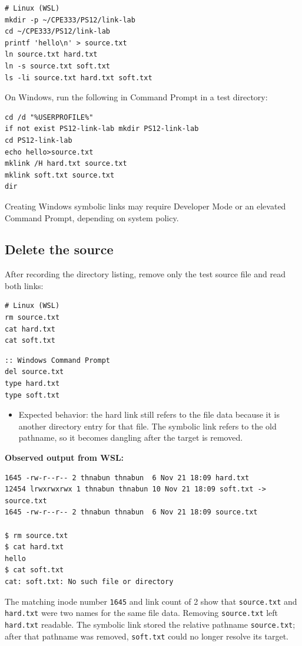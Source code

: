 \documentclass[a4paper,11pt]{article}
\begin{document}
\begin{lstlisting}
# Linux (WSL)
mkdir -p ~/CPE333/PS12/link-lab
cd ~/CPE333/PS12/link-lab
printf 'hello\n' > source.txt
ln source.txt hard.txt
ln -s source.txt soft.txt
ls -li source.txt hard.txt soft.txt
\end{lstlisting}

On Windows, run the following in Command Prompt in a test directory:
\begin{lstlisting}
cd /d "%USERPROFILE%"
if not exist PS12-link-lab mkdir PS12-link-lab
cd PS12-link-lab
echo hello>source.txt
mklink /H hard.txt source.txt
mklink soft.txt source.txt
dir
\end{lstlisting}

\noindent Creating Windows symbolic links may require Developer Mode or an
elevated Command Prompt, depending on system policy.

\subsection{Delete the source}
After recording the directory listing, remove only the test source file and
read both links:
\begin{lstlisting}
# Linux (WSL)
rm source.txt
cat hard.txt
cat soft.txt
\end{lstlisting}
\begin{lstlisting}
:: Windows Command Prompt
del source.txt
type hard.txt
type soft.txt
\end{lstlisting}

\begin{itemize}
  \item Expected behavior: the hard link still refers to the file data because
  it is another directory entry for that file. The symbolic link refers to the
  old pathname, so it becomes dangling after the target is removed.
\end{itemize}

\noindent\textbf{Observed output from WSL:}
\begin{lstlisting}
1645 -rw-r--r-- 2 thnabun thnabun  6 Nov 21 18:09 hard.txt
12454 lrwxrwxrwx 1 thnabun thnabun 10 Nov 21 18:09 soft.txt -> source.txt
1645 -rw-r--r-- 2 thnabun thnabun  6 Nov 21 18:09 source.txt

$ rm source.txt
$ cat hard.txt
hello
$ cat soft.txt
cat: soft.txt: No such file or directory
\end{lstlisting}

The matching inode number \texttt{1645} and link count of 2 show that
\texttt{source.txt} and \texttt{hard.txt} were two names for the same file
data. Removing \texttt{source.txt} left \texttt{hard.txt} readable. The
symbolic link stored the relative pathname \texttt{source.txt}; after that
pathname was removed, \texttt{soft.txt} could no longer resolve its target.
\end{document}
